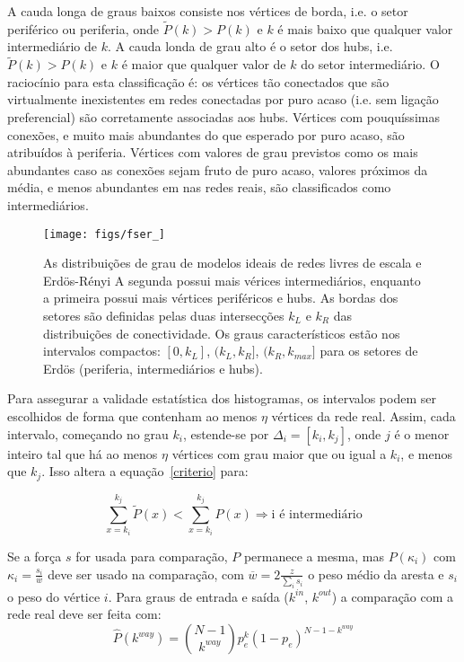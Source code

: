 \documentclass[a4paper,openright,12pt]{report} %
\begin{document}
A cauda longa de graus baixos consiste nos vértices de borda,
i.e. o setor periférico ou periferia, onde
$\widetilde{P}(k)>P(k)$ e $k$ é mais baixo
que qualquer valor intermediário de $k$.
A cauda londa de grau alto é o setor dos hubs,
i.e.
$\widetilde{P}(k)>P(k)$ e $k$ é maior que qualquer valor de $k$ do setor
intermediário.
O raciocínio para esta classificação é: os vértices tão conectados
que são virtualmente inexistentes em redes conectadas por puro acaso
(i.e. sem ligação preferencial) são corretamente associadas
aos hubs.
Vértices com pouquíssimas conexões, e muito mais abundantes do que esperado
por puro acaso, são atribuídos à periferia.
Vértices com valores de grau previstos como os mais abundantes caso
as conexões sejam fruto de puro acaso, valores próximos da média,
e menos abundantes em nas redes reais, são classificados como intermediários.


\begin{figure}[!h]
	\centering
	\texttt{[image: figs/fser\_]}
	\caption{As distribuições de grau de modelos ideais de redes livres de escala e Erdös-Rényi
		A segunda possui mais vérices intermediários, enquanto a primeira possui mais vértices
		periféricos e hubs. As bordas dos setores são definidas pelas duas intersecções $k_L$
		e $k_R$ das distribuições de conectividade.
		Os graus característicos estão nos intervalos compactos:
                $[0,k_L]$, $(k_L,k_R]$, $(k_R,k_{max}]$
	para os setores de Erdös (periferia, intermediários e hubs).}	
		\label{fig:setores}
\end{figure}

Para assegurar a validade estatística dos histogramas, os intervalos podem
ser escolhidos de forma que contenham ao menos $\eta$ vértices da rede real.
Assim, cada intervalo, começando no grau $k_i$, estende-se por
$\Delta_i=[k_{i},k_{j}]$,
onde $j$ é o menor inteiro tal que há ao menos $\eta$ vértices com grau maior que ou igual a $k_i$,
e menos que $k_j$. Isso altera a equação~\ref{criterio} para:

\begin{equation}\label{criterio2}
	\sum_{x=k_i}^{k_j} \widetilde{P}(x) < \sum_{x=k_i}^{k_j} P(x) \Rightarrow \text{i é intermediário}
\end{equation}

Se a força $s$ for usada para comparação, $P$ permanece a mesma, mas
$P(\kappa_i)$ com $\kappa_i=\frac{s_i}{\overline{w}}$
deve ser usado na comparação, com
$\overline{w}=2\frac{z}{\sum_is_i}$
o peso médio da aresta e $s_i$ o peso do vértice $i$.
Para graus de entrada e saída
($k^{in}$, $k^{out}$)
a comparação com a rede real deve ser feita com:
\begin{equation}
	\hat{P}(k^{way})=\binom{N-1}{k^{way}}p_e^k(1-p_e)^{N-1-k^{way}}
\end{equation}
\end{document}
